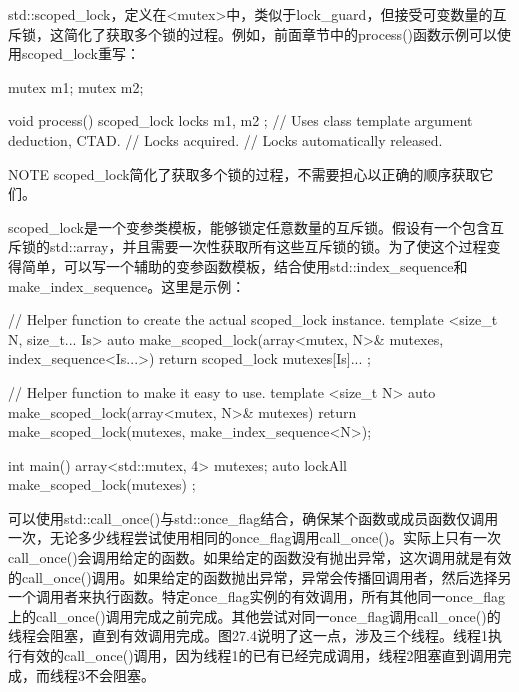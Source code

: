 
std::scoped\_lock，定义在<mutex>中，类似于lock\_guard，但接受可变数量的互斥锁，这简化了获取多个锁的过程。例如，前面章节中的process()函数示例可以使用scoped\_lock重写：

\begin{cpp}
mutex m1;
mutex m2;

void process()
{
    scoped_lock locks { m1, m2 }; // Uses class template argument deduction, CTAD.
    // Locks acquired.
} // Locks automatically released.
\end{cpp}

\begin{myNotic}{NOTE}
scoped\_lock简化了获取多个锁的过程，不需要担心以正确的顺序获取它们。
\end{myNotic}

scoped\_lock是一个变参类模板，能够锁定任意数量的互斥锁。假设有一个包含互斥锁的std::array，并且需要一次性获取所有这些互斥锁的锁。为了使这个过程变得简单，可以写一个辅助的变参函数模板，结合使用std::index\_sequence和make\_index\_sequence。这里是示例：

\begin{cpp}
// Helper function to create the actual scoped_lock instance.
template <size_t N, size_t... Is>
auto make_scoped_lock(array<mutex, N>& mutexes, index_sequence<Is...>)
{
    return scoped_lock { mutexes[Is]... };
}

// Helper function to make it easy to use.
template <size_t N>
auto make_scoped_lock(array<mutex, N>& mutexes)
{
    return make_scoped_lock(mutexes, make_index_sequence<N>{});
}

int main()
{
    array<std::mutex, 4> mutexes;
    auto lockAll { make_scoped_lock(mutexes) };
}
\end{cpp}


可以使用std::call\_once()与std::once\_flag结合，确保某个函数或成员函数仅调用一次，无论多少线程尝试使用相同的once\_flag调用call\_once()。实际上只有一次call\_once()会调用给定的函数。如果给定的函数没有抛出异常，这次调用就是有效的call\_once()调用。如果给定的函数抛出异常，异常会传播回调用者，然后选择另一个调用者来执行函数。特定once\_flag实例的有效调用，所有其他同一once\_flag上的call\_once()调用完成之前完成。其他尝试对同一once\_flag调用call\_once()的线程会阻塞，直到有效调用完成。图27.4说明了这一点，涉及三个线程。线程1执行有效的call\_once()调用，因为线程1的已有已经完成调用，线程2阻塞直到调用完成，而线程3不会阻塞。

